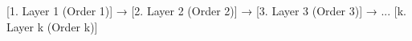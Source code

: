 [1. Layer 1 (Order 1)] → [2. Layer 2 (Order 2)] → [3. Layer 3 (Order 3)] → ... [k. Layer k (Order k)]